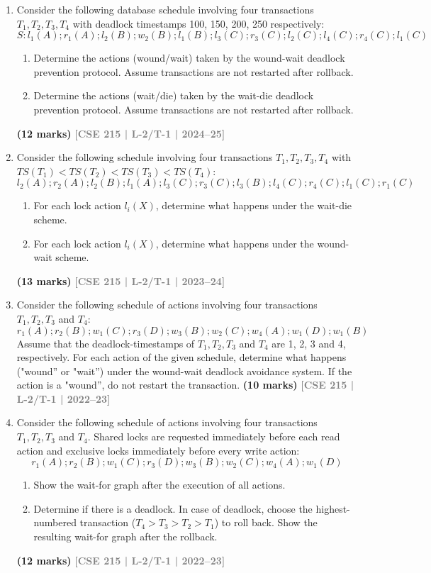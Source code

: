 \documentclass[12pt]{article}
\newcommand{\yr}[1]{\hfill\textcolor{gray}{\small\textbf{[#1]}}}
\newcommand{\mk}[1]{\textcolor{orange!70!black}{\small\textbf{(#1 marks)}}}
\begin{document}
\begin{enumerate}
\item Consider the following database schedule involving four transactions $T_1, T_2, T_3, T_4$ with deadlock timestamps 100, 150, 200, 250 respectively:
\[S\colon l_1(A); r_1(A); l_2(B); w_2(B); l_1(B); l_3(C); r_3(C); l_2(C); l_4(C); r_4(C); l_1(C)\]
\begin{enumerate}
  \item Determine the actions (wound/wait) taken by the wound-wait deadlock prevention protocol. Assume transactions are not restarted after rollback.
  \item Determine the actions (wait/die) taken by the wait-die deadlock prevention protocol. Assume transactions are not restarted after rollback.
\end{enumerate}
\mk{12} \yr{CSE 215 | L-2/T-1 | 2024--25}


\item Consider the following schedule involving four transactions $T_1, T_2, T_3, T_4$ with $TS(T_1) < TS(T_2) < TS(T_3) < TS(T_4)$:
\[l_2(A); r_2(A); l_2(B); l_1(A); l_3(C); r_3(C); l_3(B); l_4(C); r_4(C); l_1(C); r_1(C)\]
\begin{enumerate}
  \item For each lock action $l_i(X)$, determine what happens under the wait-die scheme.
  \item For each lock action $l_i(X)$, determine what happens under the wound-wait scheme.
\end{enumerate}
  \mk{13} \yr{CSE 215 | L-2/T-1 | 2023--24}


\item Consider the following schedule of actions involving four transactions $T_1, T_2, T_3$ and $T_4$:
\[r_1(A); r_2(B); w_1(C); r_3(D); w_3(B); w_2(C); w_4(A); w_1(D); w_1(B)\]
Assume that the deadlock-timestamps of $T_1, T_2, T_3$ and $T_4$ are 1, 2, 3 and 4, respectively. For each action of the given schedule, determine what happens ("wound'' or "wait'') under the wound-wait deadlock avoidance system. If the action is a "wound'', do not restart the transaction.
\mk{10} \yr{CSE 215 | L-2/T-1 | 2022--23}


\item Consider the following schedule of actions involving four transactions $T_1, T_2, T_3$ and $T_4$. Shared locks are requested immediately before each read action and exclusive locks immediately before every write action:
\[r_1(A); r_2(B); w_1(C); r_3(D); w_3(B); w_2(C); w_4(A); w_1(D)\]
\begin{enumerate}
  \item Show the wait-for graph after the execution of all actions.
  \item Determine if there is a deadlock. In case of deadlock, choose the highest-numbered transaction ($T_4 > T_3 > T_2 > T_1$) to roll back. Show the resulting wait-for graph after the rollback.
\end{enumerate}
\mk{12} \yr{CSE 215 | L-2/T-1 | 2022--23}



\end{enumerate}
\end{document}
